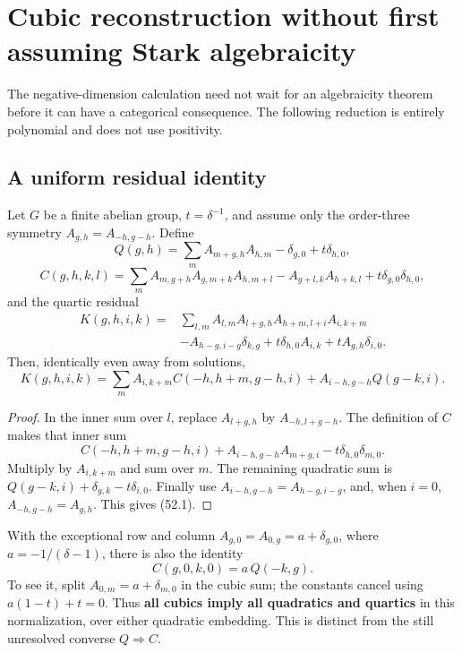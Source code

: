 \documentclass[11pt,reqno]{amsart}
\theoremstyle{plain}
\begin{document}
\section{Cubic reconstruction without first assuming Stark algebraicity}\label{sec:52}

The negative-dimension calculation need not wait for an algebraicity
theorem before it can have a categorical consequence. The following
reduction is entirely polynomial and does not use positivity.

\subsection{A uniform residual identity}\label{sec:52.1}

Let \(G\) be a finite abelian group, \(t=\delta^{-1}\), and assume only
the order-three symmetry \(A_{g,h}=A_{-h,g-h}\). Define
\[
 Q(g,h)=\sum_m A_{m+g,h}A_{h,m}-\delta_{g,0}+t\delta_{h,0},
\]
\[
 C(g,h,k,l)=\sum_m A_{m,g+h}A_{g,m+k}A_{h,m+l}
 -A_{g+l,k}A_{h+k,l}+t\delta_{g,0}\delta_{h,0},
\]
and the quartic residual
\[
\begin{aligned}
 K(g,h,i,k)={}&\sum_{l,m}A_{l,m}A_{l+g,h}A_{h+m,l+i}A_{i,k+m}\\
 &-A_{h-g,i-g}\delta_{k,g}
 +t\delta_{h,0}A_{i,k}+tA_{g,h}\delta_{i,0}.
\end{aligned}
\]
Then, identically even away from solutions,
\begin{equation*}
 \boxed{\displaystyle
 K(g,h,i,k)=
 \sum_m A_{i,k+m}C(-h,h+m,g-h,i)
 +A_{i-h,g-h}Q(g-k,i).
 }\tag{52.1}
\end{equation*}

\begin{proof}
In the inner sum over \(l\), replace
\(A_{l+g,h}\) by \(A_{-h,l+g-h}\). The definition of \(C\) makes
that inner sum
\[
 C(-h,h+m,g-h,i)+A_{i-h,g-h}A_{m+g,i}
 -t\delta_{h,0}\delta_{m,0}.
\]
Multiply by \(A_{i,k+m}\) and sum over \(m\). The remaining quadratic
sum is \(Q(g-k,i)+\delta_{g,k}-t\delta_{i,0}\).
Finally use \(A_{i-h,g-h}=A_{h-g,i-g}\), and, when \(i=0\),
\(A_{-h,g-h}=A_{g,h}\). This gives (52.1).
\end{proof}

With the exceptional row and column
\(A_{g,0}=A_{0,g}=a+\delta_{g,0}\), where
\(a=-1/(\delta-1)\), there is also the identity
\begin{equation*}
 \boxed{C(g,0,k,0)=a\,Q(-k,g).}\tag{52.2}
\end{equation*}
To see it, split \(A_{0,m}=a+\delta_{m,0}\) in the cubic sum;
the constants cancel using \(a(1-t)+t=0\).
Thus \textbf{all cubics imply all quadratics and quartics} in this
normalization, over either quadratic embedding. This is distinct
from the still unresolved converse \(Q\Rightarrow C\).
\end{document}
